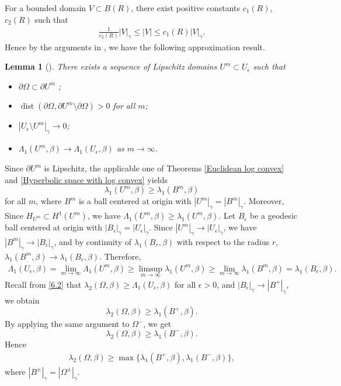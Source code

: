 \documentclass[11pt,leqno]{amsart}
\newtheorem{lemma}{Lemma}[section]
\numberwithin{equation}{section}
\begin{document}
For a bounded domain $V\subset B(R)$, there exist positive constants $c_1(R)$, $c_2(R)$ such that 
\begin{align*}
 \frac{1}{c_{2}(R)}|V|_{\gamma}\leq |V|\leq c_{1}(R)|V|_{\gamma}.  
\end{align*}
 Hence by the arguments in \cite[Lemma 3.3]{KennegyPAMS}, we have the following approximation result.
\begin{lemma} [\cite{KennegyPAMS}]
    There exists a sequence of Lipschitz domains $U^m\subset U_{\epsilon}$ such that
    \begin{itemize}
        \item [(1)]    $\partial \Omega \subset \partial U^m$ ;
        \item [(2)] $\operatorname{dist}(\partial \Omega,\partial U^m\setminus \partial \Omega)>0$ for all $m$;
        \item [(3)] $|U_{\epsilon}\setminus U^m|_{\gamma}\rightarrow 0$;
        \item [(4)] $\Lambda_{1}(U^m,\beta)\rightarrow \Lambda_{1}(U_{\epsilon},\beta)$ as $m\rightarrow \infty$.
    \end{itemize}
\end{lemma}
Since $\partial U^m$ is Lipschitz, the applicable one of Theorems \ref{Euclidean log convex} and  \ref{Hyperbolic space with log convex} yields
$$\lambda_{1}(U^m,\beta)\geq \lambda_{1}(B^m,\beta)$$ for all $m$, where $B^m$ is a ball centered at origin with $|U^m|_{\gamma}=|B^m|_{\gamma}$. Moreover, Since $H_{U^m}\subset H^{1}(U^m)$, we have $\Lambda_{1}(U^m,\beta)\geq \lambda_{1}(U^m,\beta)$. Let $B_{\epsilon}$ be a geodesic ball centered at origin with $|B_{\epsilon}|_{\gamma}=|U_{\epsilon}|_{\gamma}$. Since $|U^m|_{\gamma}\rightarrow |U_\epsilon|_{\gamma}$, we have $|B^m|_{\gamma}\rightarrow |B_{\epsilon}|_{\gamma}$, and by continuity of $\lambda_1(B_r, \beta)$  with respect to the radius $r$, 
 $\lambda_{1}(B^m,\beta)\rightarrow \lambda_{1}(B_{\epsilon},\beta)$. Therefore,
\begin{align}
    \Lambda_{1}(U_{\epsilon},\beta)=\lim_{m\rightarrow\infty}\Lambda_{1}(U^m,\beta)\geq \limsup_{m\rightarrow \infty}\lambda_{1}(U^m,\beta)\geq \lim_{m\rightarrow \infty} \lambda_{1}(B^m,\beta)=\lambda_{1}(B_{\epsilon},\beta).
\end{align}
Recall from \eqref{6.2} that  $\lambda_{2}(\Omega,\beta)\geq \Lambda_{1}(U_{\epsilon},\beta)$ for all $\epsilon>0$, and  $|B_{\epsilon}|_{\gamma}\rightarrow |B^{+}|_{\gamma}$, we obtain $$\lambda_{2}(\Omega,\beta)\geq \lambda_{1}(B^{+},\beta).$$ 
By applying the same argument to $\Omega^-$, we get
 $$\lambda_{2}(\Omega,\beta)\geq \lambda_{1}(B^{-},\beta).$$
 Hence
\begin{align}\label{6.4}
 \lambda_{2}(\Omega,\beta)\geq \max\{\lambda_{1}(B^{+},\beta),\lambda_{1}(B^{-},\beta)\},   
\end{align}
where $|B^{\pm}|_{\gamma}=|\Omega^{\pm}|_{\gamma}$.
\end{document}
